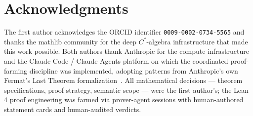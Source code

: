 \documentclass[11pt,a4paper]{article}
\theoremstyle{plain}
\theoremstyle{definition}
\begin{document}
\section*{Acknowledgments}

The first author acknowledges the ORCID identifier \texttt{0009-0002-0734-5565} and thanks the mathlib community for the deep $C^{\ast}$-algebra infrastructure that made this work possible. Both authors thank Anthropic for the compute infrastructure and the Claude Code / Claude Agents platform on which the coordinated proof-farming discipline was implemented, adopting patterns from Anthropic's own Fermat's Last Theorem formalization~\cite{anthropic_flt_2026}. All mathematical decisions --- theorem specifications, proof strategy, semantic scope --- were the first author's; the Lean 4 proof engineering was farmed via prover-agent sessions with human-authored statement cards and human-audited verdicts.
\end{document}
